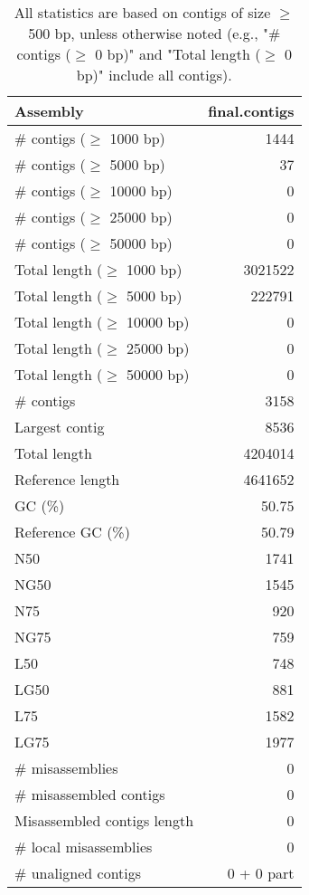 \documentclass[12pt,a4paper]{article}
\begin{document}
\begin{table}[ht]
\begin{center}
\caption{All statistics are based on contigs of size $\geq$ 500 bp, unless otherwise noted (e.g., "\# contigs ($\geq$ 0 bp)" and "Total length ($\geq$ 0 bp)" include all contigs).}
\begin{tabular}{|l*{1}{|r}|}
\hline
Assembly & final.contigs \\ \hline
\# contigs ($\geq$ 1000 bp) & 1444 \\ \hline
\# contigs ($\geq$ 5000 bp) & 37 \\ \hline
\# contigs ($\geq$ 10000 bp) & 0 \\ \hline
\# contigs ($\geq$ 25000 bp) & 0 \\ \hline
\# contigs ($\geq$ 50000 bp) & 0 \\ \hline
Total length ($\geq$ 1000 bp) & 3021522 \\ \hline
Total length ($\geq$ 5000 bp) & 222791 \\ \hline
Total length ($\geq$ 10000 bp) & 0 \\ \hline
Total length ($\geq$ 25000 bp) & 0 \\ \hline
Total length ($\geq$ 50000 bp) & 0 \\ \hline
\# contigs & 3158 \\ \hline
Largest contig & 8536 \\ \hline
Total length & 4204014 \\ \hline
Reference length & 4641652 \\ \hline
GC (\%) & 50.75 \\ \hline
Reference GC (\%) & 50.79 \\ \hline
N50 & 1741 \\ \hline
NG50 & 1545 \\ \hline
N75 & 920 \\ \hline
NG75 & 759 \\ \hline
L50 & 748 \\ \hline
LG50 & 881 \\ \hline
L75 & 1582 \\ \hline
LG75 & 1977 \\ \hline
\# misassemblies & 0 \\ \hline
\# misassembled contigs & 0 \\ \hline
Misassembled contigs length & 0 \\ \hline
\# local misassemblies & 0 \\ \hline
\# unaligned contigs & 0 + 0 part \\ \hline

\end{tabular}
\end{center}
\end{table}
\end{document}
